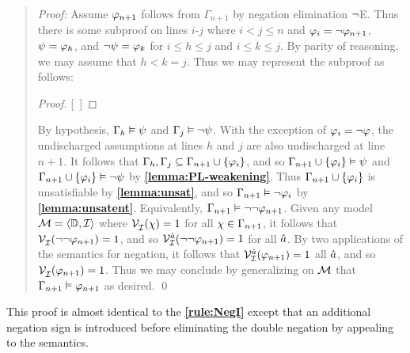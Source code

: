 \begin{quote} 
  \textit{Proof:} Assume $\varphi_{n+1}$ follows from $\Gamma_{n+1}$ by negation elimination $\neg$E.
  Thus there is some subproof on lines $i$-$j$ where $i<j\leq n$ and $\varphi_i=\neg\varphi_{n+1}$, $\psi=\varphi_h$, and $\neg\psi=\varphi_k$ for $i\leq h\leq j$ and $i\leq k\leq j$.
  By parity of reasoning, we may assume that $h<k=j$.
  Thus we may represent the subproof as follows:

  \begin{proof}
  \open
     
  \close
  [\ ]{\metaA} %
  \end{proof}

  By hypothesis, $\Gamma_h \vDash \psi$ and $\Gamma_j \vDash \neg\psi$.
  With the exception of $\varphi_i=\neg\varphi$, the undischarged assumptions at lines $h$ and $j$ are also undischarged at line $n+1$.
  It follows that $\Gamma_h,\Gamma_j\subseteq\Gamma_{n+1}\cup\lbrace\varphi_i\rbrace$, and so $\Gamma_{n+1}\cup\lbrace\varphi_i\rbrace \vDash \psi$ and $\Gamma_{n+1}\cup\lbrace\varphi_i\rbrace \vDash \neg\psi$ by \textbf{\ref{lemma:PL-weakening}}.
  Thus $\Gamma_{n+1}\cup\lbrace\varphi_i\rbrace$ is unsatisfiable by \textbf{\ref{lemma:unsat}}, and so $\Gamma_{n+1} \vDash \neg\varphi_i$ by \textbf{\ref{lemma:unsatent}}.
  Equivalently, $\Gamma_{n+1} \vDash \neg\neg\varphi_{n+1}$.
  Given any model $\mathcal{M}=\langle\mathbb{D},\mathcal{I}\rangle$ where $\mathcal{V}_{\mathcal{I}}^{}(\chi) = 1$ for all $\chi \in \Gamma_{n+1}$, it follows that $\mathcal{V}_{\mathcal{I}}^{}(\neg\neg\varphi_{n+1}) = 1$, and so $\mathcal{V}_{\mathcal{I}}^{\hat{a}}(\neg\neg\varphi_{n+1})=1$ for all $\hat{a}$. 
  By two applications of the semantics for negation, it follows that $\mathcal{V}_{\mathcal{I}}^{\hat{a}}(\varphi_{n+1})=1$ all $\hat{a}$, and so $\mathcal{V}_{\mathcal{I}}^{}(\varphi_{n+1}) = 1$.
  Thus we may conclude by generalizing on $\mathcal{M}$ that $\Gamma_{n+1} \vDash \varphi_{n+1}$ as desired.
  \qed
\end{quote}

This proof is almost identical to the \textbf{\ref{rule:NegI}} except that an additional negation sign is introduced before eliminating the double negation by appealing to the semantics.

